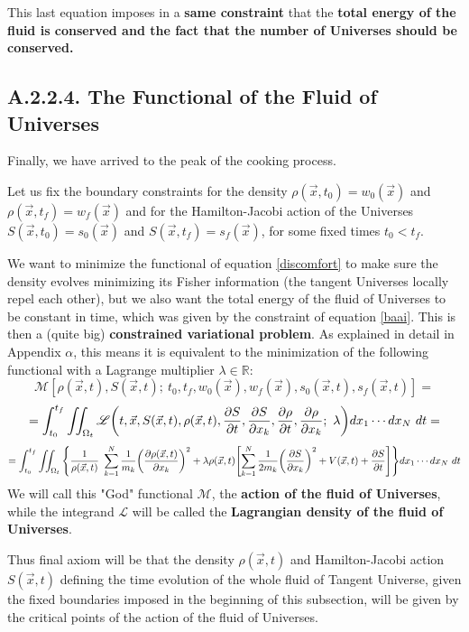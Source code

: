 \documentclass[11pt, a4paper]{article} %
\newcommand{\R}{\mathbb{R}} %
\newcommand{\M}{\mathcal{M}}
\newcommand{\Lg}{\mathscr{L}}
\begin{document}
This last equation imposes in a {\bf  same constraint} that the {\bf total energy of the fluid is conserved and the fact that the number of Universes should be conserved.}

\subsection*{A.2.2.4. The Functional of the Fluid of Universes}
Finally, we have arrived to the peak of the cooking process.

Let us fix the boundary constraints for the density $\rho(\vec{x},t_0)=w_0(\vec{x})$ and $\rho(\vec{x},t_f)=w_f(\vec{x})$ and for the Hamilton-Jacobi action of the Universes $S(\vec{x},t_0)=s_0(\vec{x})$ and $S(\vec{x},t_f)=s_f(\vec{x})$, for some fixed times $t_0<t_f$.

We want to minimize the functional of equation \eqref{discomfort} to make sure the density evolves minimizing its Fisher information (the tangent Universes locally repel each other), but we also want the total energy of the fluid of Universes to be constant in time, which was given by the constraint of equation \eqref{baai}. This is then a (quite big) {\bf constrained variational problem}. As explained in detail in Appendix $\alpha$, this means it is equivalent to the minimization of the following functional with a Lagrange multiplier $\lambda\in\R$:
\begin{equation}\label{discomfort}
\M[\rho(\vec{x},t), S(\vec{x},t);\ t_0,t_f,w_0(\vec{x}), w_f(\vec{x}), s_0(\vec{x},t), s_f(\vec{x},t)]=
\end{equation} 
$$
=\int_{t_0}^{t_f} \iint_{\Omega_t} \Lg\qty(t, \vec{x}, S(\vec{x},t), \rho(\vec{x},t), \pdv{S}{t}, \pdv{S}{x_k}, \pdv{\rho}{t}, \pdv{\rho}{x_k}; \ \lambda) dx_1\cdots dx_N\ dt=
$$
$$
=\int_{t_0}^{t_f} \iint_{\Omega_t}\qty{ \frac{1}{\rho(\vec{x},t)}\ \sum_{k=1}^N\frac{1}{m_k} \qty(\pdv{\rho(\vec{x},t)}{x_k})^2 + \lambda \rho(\vec{x},t) \qty[ \sum_{k=1}^N \frac{1}{2m_k} \qty(\pdv{S}{x_k})^2+V(\vec{x},t)+\pdv{S}{t} ]}  dx_1\cdots dx_N\ dt
$$
We will call this "God" functional $\M$, the {\bf action of the fluid of Universes}, while the integrand $\Lg$ will be called the {\bf Lagrangian density of the fluid of Universes}.

Thus final axiom will be that the density $\rho(\vec{x},t)$ and Hamilton-Jacobi action $S(\vec{x},t)$ defining the time evolution of the whole fluid of Tangent Universe, given the fixed boundaries imposed in the beginning of this subsection, will be given by the critical points of the action of the fluid of Universes.
\end{document}
